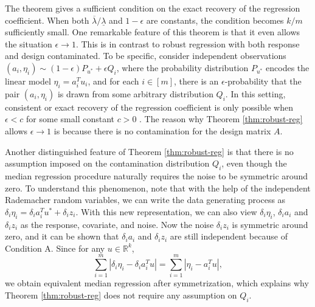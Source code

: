 The theorem gives a sufficient condition on the exact recovery of the regression coefficient. When both $\overline{\lambda}/\underline{\lambda}$ and $1-\epsilon$ are constants, the condition becomes $k/m$ sufficiently small. One remarkable feature of this theorem is that it even allows the situation $\epsilon\rightarrow 1$. This is in contrast to robust regression with both response and design contaminated. To be specific, consider independent observations $(a_i,\eta_i)\sim (1-\epsilon)P_{u^*}+\epsilon Q_i$, where the probability distribution $P_{u^*}$ encodes the linear model $\eta_i=a_i^Tu_i$, and for each $i\in[m]$, there is an $\epsilon$-probability that the pair $(a_i,\eta_i)$ is drawn from some arbitrary distribution $Q_i$. In this setting, consistent or exact recovery of the regression coefficient is only possible when $\epsilon<c$ for some small constant $c>0$ \citep{gao2020}. The reason why Theorem \ref{thm:robust-reg} allows $\epsilon\rightarrow 1$ is because there is no contamination for the design matrix $A$.

Another distinguished feature of Theorem \ref{thm:robust-reg} is that there is no assumption imposed on the contamination distribution $Q_i$, even though the median regression procedure naturally requires the noise to be symmetric around zero. To understand this phenomenon, note that with the help of the independent Rademacher random variables, we can write the data generating process as $\delta_i\eta_i=\delta_ia_i^Tu^*+\delta_iz_i$. With this new representation, we can also view $\delta_i\eta_i$, $\delta_ia_i$ and $\delta_iz_i$ as the response, covariate, and noise. Now the noise $\delta_iz_i$ is symmetric around zero, and it can be shown that $\delta_ia_i$ and $\delta_iz_i$ are still independent because of Condition A. Since for any $u\in\mathbb{R}^k$,
$$\sum_{i=1}^m|\delta_i\eta_i- \delta_ia_i^Tu|=\sum_{i=1}^m|\eta_i-a_i^Tu|,$$
we obtain equivalent median regression after symmetrization, which explains why Theorem \ref{thm:robust-reg} does not require any assumption on $Q_i$.
